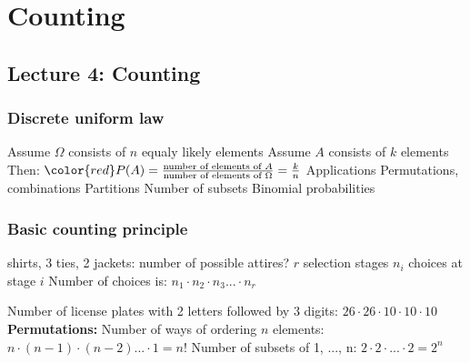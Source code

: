 
\chapter{Counting} %

\label{Unit 3} %


\section{Lecture 4: Counting}

\subsection{Discrete uniform law}
\begin{outline}
\1 Assume $\Omega$ consists of $n$ equaly likely elements
\1 Assume $A$ consists of $k$ elements
\1 Then: $\color{red} P(A) = \frac{\text{number of elements of } A}{\text{number of elements of } \Omega} = \frac{k}{n}$
\1 Applications
  \2 Permutations, combinations
  \2 Partitions
  \2 Number of subsets
  \2 Binomial probabilities
\end{outline}

\subsection{Basic counting principle}

\begin{outline}
 shirts, 3 ties, 2 jackets: number of possible attires?
  \2 $r$ selection stages
  \2 $n_i$ choices at stage $i$
\1 Number of choices is: $n_1 \cdot n_2 \cdot n_3 ... \cdot n_r$
\end{outline}

\begin{outline}
\1 Number of license plates with 2 letters followed by 3 digits:
  \2 $26 \cdot 26 \cdot 10 \cdot 10 \cdot 10$
\1 \textbf{Permutations:} Number of ways of ordering $n$ elements:
  \2 $n \cdot (n-1) \cdot (n-2) ... \cdot 1 = n!$
\1 Number of subsets of {1, ..., n}:
  \2 $2 \cdot 2 \cdot ... \cdot 2 = 2^n$
\end{outline}



